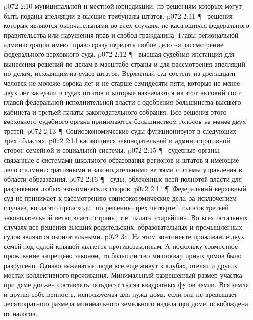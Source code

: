 \vs p072 2:10 \bibnobreakspace {} муниципальной и местной юрисдикции, по решениям которых могут быть поданы апелляции в высшие трибуналы штатов.
\vs p072 2:11 \P\ \bibnobreakspace {} решения которых являются окончательными во всех случаях, не касающихся федерального правительства или нарушения прав и свобод гражданина. Главы региональной администрации имеют право сразу передать любое дело на рассмотрение федерального верховного суда.
\vs p072 2:12 \P\ \bibnobreakspace {} высшая судебная инстанция для вынесения решений по делам в масштабе страны и для рассмотрения апелляций по делам, исходящим из судов штатов. Верховный суд состоит из двенадцати человек не моложе сорока лет и не старше семидесяти пяти, которые не менее двух лет заседали в судах штатов и которые назначаются на этот высокий пост главой федеральной исполнительной власти с одобрения большинства высшего кабинета и третьей палаты законодательного собрания. Все решения этого верховного судебного органа принимаются большинством голосов не менее двух третей.
\vs p072 2:13 \P\ Социоэкономические суды функционируют в следующих трех областях:
\vs p072 2:14 \bibnobreakspace {} касающиеся законодательной и административной сторон семейной и социальной системы.
\vs p072 2:15 \P\ \bibnobreakspace {} судебные органы, связанные с системами школьного образования регионов и штатов и имеющие дело с административными и законодательными ветвями системы управления в области образования.
\vs p072 2:16 \P\ \bibnobreakspace {} суды, облеченные всей полнотой власти для разрешения любых экономических споров.
\vs p072 2:17 \P\ Федеральный верховный суд не принимает к рассмотрению социоэкономические дела, за исключением случаев, когда это происходит по решению трех четвертей голосов третьей законодательной ветви власти страны, т.е. палаты старейшин. Во всех остальных случаях все решения высших родительских, образовательных и промышленных судов являются окончательными.
\vs p072 3:1 На этом континенте проживание двух семей под одной крышей является противозаконным. А поскольку совместное проживание запрещено законом, то большинство многоквартирных домов было разрушено. Однако неженатые люди все еще живут в клубах, отелях и других местах коллективного проживания. Минимальный разрешенный размер участка при доме должен составлять пятьдесят тысяч квадратных футов земли. Вся земля и другая собственность, используемая для нужд дома, если она не превышает десятикратного размера минимального земельного надела при доме, освобождена от налогов.
